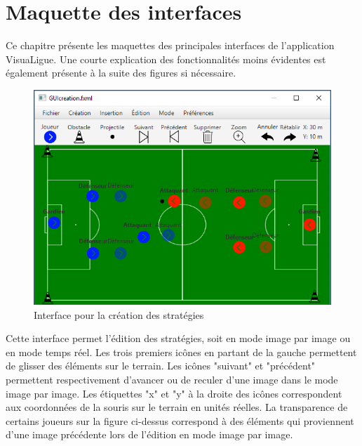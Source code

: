 
\chapter{Maquette des interfaces}
\label{s:maquettes_interfaces}

Ce chapitre présente les maquettes des principales interfaces de l'application VisuaLigue.
Une courte explication des fonctionnalités moins évidentes est également présente à la suite des figures si nécessaire.

\begin{figure}[htpb]
    \centering
    \includegraphics[scale=0.7]{fig/gui/gui_creation.png}
    \caption{Interface pour la création des stratégies}
    \label{fig:gui:gui_creation}
\end{figure}

Cette interface permet l'édition des stratégies, soit en mode image par image ou en mode temps réel.
Les trois premiers icônes en partant de la gauche permettent de glisser des éléments sur le terrain.
Les icônes "suivant" et "précédent" permettent respectivement d'avancer ou de reculer d'une image dans le mode image par image.
Les étiquettes "x" et "y" à la droite des icônes correspondent aux coordonnées de la souris sur le terrain en unités réelles.
La transparence de certains joueurs sur la figure ci-dessus correspond à des éléments qui proviennent d'une image précédente lors de l'édition en mode image par image.

